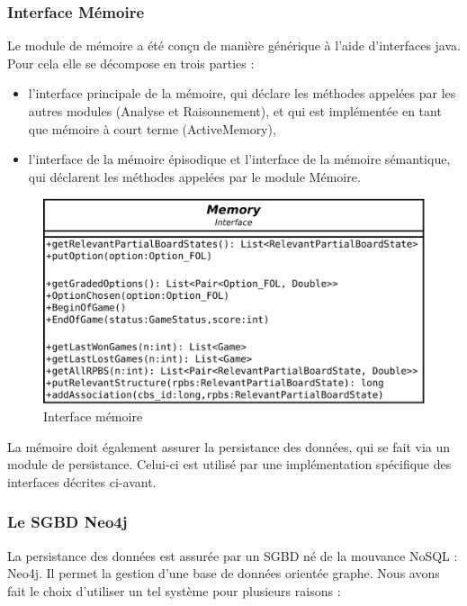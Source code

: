 \subsubsection{Interface Mémoire}

Le module de mémoire a été conçu de manière générique à l'aide d'interfaces java. Pour cela elle se décompose en trois parties :

\begin{itemize}
\item l'interface principale de la mémoire, qui déclare les méthodes appelées par les autres modules (Analyse et Raisonnement), et qui est implémentée en tant que mémoire à court terme (ActiveMemory),

\item l'interface de la mémoire épisodique et l'interface de la mémoire sémantique, qui déclarent les méthodes appelées par le module Mémoire.
\end{itemize}

\begin{figure}[H]
\includegraphics[width=\textwidth]{files/memoire/interface}
\caption{Interface mémoire}
\end{figure}

La mémoire doit également assurer la persistance des données, qui se fait via un module de persistance. Celui-ci est utilisé par une implémentation spécifique des interfaces décrites ci-avant.

\subsubsection{Le \gls{SGBD} Neo4j}

La persistance des données est assurée par un SGBD né de la mouvance \gls{NoSQL} : Neo4j. Il permet la gestion d'une base de données orientée graphe. Nous avons fait le choix d'utiliser un tel système pour plusieurs raisons :

